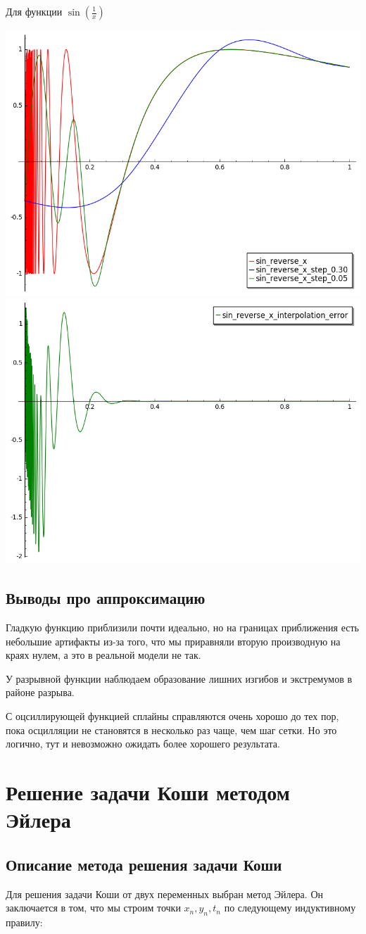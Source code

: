 \documentclass{article}
\theoremstyle{definition}
\theoremstyle{remark}
\newcommand{\lfrac} [2] {\displaystyle \frac{#1}{#2}}
\begin{document}
Для функции $\sin\left(\lfrac{1}{x}\right)$

\includegraphics[width=0.4 \textwidth]{sin_reverse_x_splines_image.png}
\includegraphics[width=0.4 \textwidth]{sin_reverse_x_interpolation_error.png}

\subsection{Выводы про аппроксимацию}

Гладкую функцию приблизили почти идеально, но на границах приближения есть небольшие артифакты из-за того, что мы приравняли вторую производную на краях нулем, а это в реальной модели не так.

У разрывной функции наблюдаем образование лишних изгибов и экстремумов в районе разрыва.

С оцсиллирующей функцией сплайны справляются очень хорошо до тех пор, пока осцилляции не становятся в несколько раз чаще, чем шаг сетки. Но это логично, тут и невозможно ожидать более хорошего результата.

\section{Решение задачи Коши методом Эйлера}

\subsection{Описание метода решения задачи Коши}

Для решения задачи Коши от двух переменных выбран метод Эйлера. Он заключается в том, что мы строим точки $x_n, y_n, t_n$ по следующему индуктивному правилу:
\end{document}
